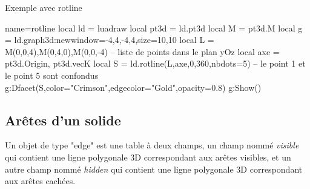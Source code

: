 \begin{demo}{Exemple avec rotline}
\begin{luadraw}{name=rotline}
local ld = luadraw
local pt3d = ld.pt3d
local M = pt3d.M
local g = ld.graph3d:new{window={-4,4,-4,4},size={10,10}}
local L = {M(0,0,4),M(0,4,0),M(0,0,-4)} -- liste de points dans le plan yOz
local axe = {pt3d.Origin, pt3d.vecK}
local S = ld.rotline(L,axe,0,360,{nbdots=5}) -- le point 1 et le point 5 sont confondus
g:Dfacet(S,{color="Crimson",edgecolor="Gold",opacity=0.8})
g:Show()
\end{luadraw}
\end{demo}      


\subsection{Arêtes d'un solide}

Un objet de type "edge" est une table à deux champs, un champ nommé \emph{visible} qui contient une ligne polygonale 3D correspondant aux arêtes visibles, et un autre champ nommé \emph{hidden} qui contient une ligne polygonale 3D correspondant aux arêtes cachées.

